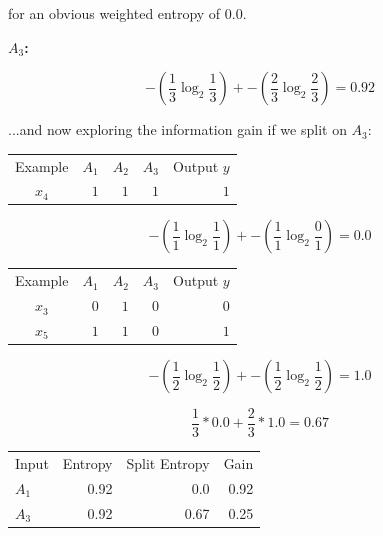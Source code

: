 \documentclass{article}
\begin{document}
\noindent for an obvious weighted entropy of 0.0.

\noindent \textbf{$A_3$:}

\begin{equation}
    -(\frac{1}{3}\log_2{\frac{1}{3}}) + -(\frac{2}{3}\log_2{\frac{2}{3}}) = 0.92
\end{equation}

\noindent ...and now exploring the information gain if we split on $A_3$:

\begin{center}
    \begin{tabular}{ c r r r r }
        Example & $A_1$ & $A_2$ & $A_3$ & Output $y$\\ 
        $x_4$ & $1$ & $1$ & $1$ & $1$\\
    \end{tabular}
\end{center}

\begin{equation}
    -(\frac{1}{1}\log_2{\frac{1}{1}}) + -(\frac{1}{1}\log_2{\frac{0}{1}}) = 0.0
\end{equation}

\begin{center}
    \begin{tabular}{ c r r r r }
        Example & $A_1$ & $A_2$ & $A_3$ & Output $y$\\ 
        $x_3$ & $0$ & $1$ & $0$ & $0$\\
        $x_5$ & $1$ & $1$ & $0$ & $1$\\
    \end{tabular}
\end{center}

\begin{equation}
    -(\frac{1}{2}\log_2{\frac{1}{2}}) + -(\frac{1}{2}\log_2{\frac{1}{2}}) = 1.0
\end{equation}

\begin{equation}
    \frac{1}{3} * 0.0 + \frac{2}{3} * 1.0 = 0.67
\end{equation}

\begin{center}
    \begin{tabular}{l r r r}
        Input & Entropy & Split Entropy & Gain\\
        $A_1$ & 0.92 & 0.0 & 0.92\\
        $A_3$ & 0.92 & 0.67 & 0.25 \\
    \end{tabular}
\end{center}
\end{document}
